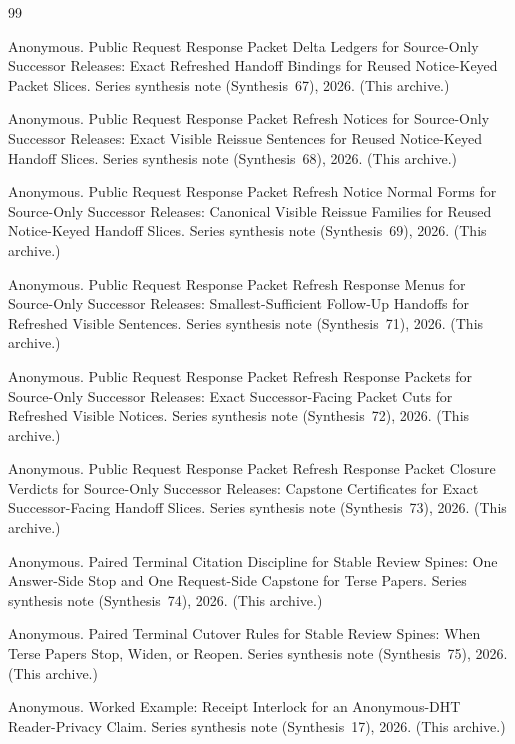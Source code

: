 \documentclass[11pt]{article}
\begin{document}
\begin{thebibliography}{99}\small

Anonymous.
\newblock Public Request Response Packet Delta Ledgers for Source-Only Successor Releases: Exact Refreshed Handoff Bindings for Reused Notice-Keyed Packet Slices.
\newblock Series synthesis note (Synthesis~67), 2026. (This archive.)

Anonymous.
\newblock Public Request Response Packet Refresh Notices for Source-Only Successor Releases: Exact Visible Reissue Sentences for Reused Notice-Keyed Handoff Slices.
\newblock Series synthesis note (Synthesis~68), 2026. (This archive.)

Anonymous.
\newblock Public Request Response Packet Refresh Notice Normal Forms for Source-Only Successor Releases: Canonical Visible Reissue Families for Reused Notice-Keyed Handoff Slices.
\newblock Series synthesis note (Synthesis~69), 2026. (This archive.)

Anonymous.
\newblock Public Request Response Packet Refresh Response Menus for Source-Only Successor Releases: Smallest-Sufficient Follow-Up Handoffs for Refreshed Visible Sentences.
\newblock Series synthesis note (Synthesis~71), 2026. (This archive.)

Anonymous.
\newblock Public Request Response Packet Refresh Response Packets for Source-Only Successor Releases: Exact Successor-Facing Packet Cuts for Refreshed Visible Notices.
\newblock Series synthesis note (Synthesis~72), 2026. (This archive.)

Anonymous.
\newblock Public Request Response Packet Refresh Response Packet Closure Verdicts for Source-Only Successor Releases: Capstone Certificates for Exact Successor-Facing Handoff Slices.
\newblock Series synthesis note (Synthesis~73), 2026. (This archive.)

Anonymous.
\newblock Paired Terminal Citation Discipline for Stable Review Spines: One Answer-Side Stop and One Request-Side Capstone for Terse Papers.
\newblock Series synthesis note (Synthesis~74), 2026. (This archive.)

Anonymous.
\newblock Paired Terminal Cutover Rules for Stable Review Spines: When Terse Papers Stop, Widen, or Reopen.
\newblock Series synthesis note (Synthesis~75), 2026. (This archive.)

Anonymous.
\newblock Worked Example: Receipt Interlock for an Anonymous-DHT Reader-Privacy Claim.
\newblock Series synthesis note (Synthesis~17), 2026. (This archive.)

\end{thebibliography}
\end{document}

